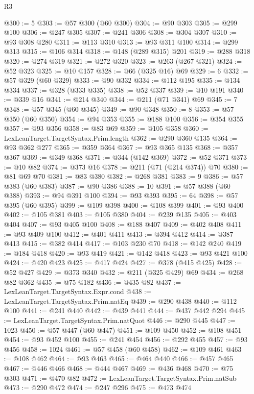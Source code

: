 \begin{lexlean}{R3}
\begin{coremodule}
@300 := 5
@303 := @57 @300 (@60 @300)
@304 := @90 @303
@305 := @299 @100
@306 := @247 @305
@307 := @241 @306
@308 := @304 @307
@310 := @93 @308 @280
@311 := @113 @310
@313 := @93 @311 @100
@314 := @299 @313
@315 := @106 @314
@318 := @148 (@289 @315) @201
@319 := @288 @318
@320 := @274 @319
@321 := @272 @320
@323 := @263 (@267 @321)
@324 := @52 @323
@325 := @10 @157
@328 := @66 (@325 @16) @69
@329 := 6
@332 := @57 @329 (@60 @329)
@333 := @90 @332
@334 := @112 @195
@335 := @134 @334
@337 := @328 (@333 @335)
@338 := @52 @337
@339 := @10 @191
@340 := @339 @16
@341 := @214 @340
@344 := @211 (@71 @341) @69
@345 := 7
@348 := @57 @345 (@60 @345)
@349 := @90 @348
@350 := 8
@353 := @57 @350 (@60 @350)
@354 := @94 @353
@355 := @188 @100
@356 := @354 @355
@357 := @93 @356
@358 := @83 @69
@359 := @105 @358
@360 := LexLeanTarget.TargetSyntax.Prim.length
@362 := @290 @360 @135
@364 := @93 @362 @277
@365 := @359 @364
@367 := @93 @365 @135
@368 := @357 @367
@369 := @349 @368
@371 := @344 (@142 @369)
@372 := @52 @371
@373 := @10 @82
@374 := @373 @16
@378 := @211 (@71 (@214 @374)) @70
@380 := @81 @69 @70
@381 := @83 @380
@382 := @268 @381
@383 := 9
@386 := @57 @383 (@60 @383)
@387 := @90 @386
@388 := 10
@391 := @57 @388 (@60 @388)
@393 := @94 @391 @100
@394 := @93 @393
@395 := 64
@398 := @57 @395 (@60 @395)
@399 := @109 @398
@400 := @108 @399
@401 := @93 @400
@402 := @105 @381
@403 := @105 @380
@404 := @239 @135
@405 := @403 @404
@407 := @93 @405 @100
@408 := @188 @407
@409 := @402 @408
@411 := @93 @409 @100
@412 := @401 @411
@413 := @394 @412
@414 := @387 @413
@415 := @382 @414
@417 := @103 @230 @70
@418 := @142 @240
@419 := @184 @418
@420 := @93 @419
@421 := @142 @418
@423 := @93 @421 @100
@424 := @420 @423
@425 := @417 @424
@427 := @378 (@415 @425)
@428 := @52 @427
@429 := @373 @340
@432 := @211 (@325 @429) @69
@434 := @268 @82 @362
@435 := @75 @182
@436 := @435 @82
@437 := LexLeanTarget.TargetSyntax.Expr.cond
@438 := LexLeanTarget.TargetSyntax.Prim.natEq
@439 := @290 @438
@440 := @112 @100
@441 := @241 @440
@442 := @439 @441
@444 := @437 @442 @294
@445 := LexLeanTarget.TargetSyntax.Prim.natQuot
@446 := @290 @445
@447 := 1023
@450 := @57 @447 (@60 @447)
@451 := @109 @450
@452 := @108 @451
@454 := @93 @452 @100
@455 := @241 @454
@456 := @292 @455
@457 := @93 @456
@458 := 1024
@461 := @57 @458 (@60 @458)
@462 := @109 @461
@463 := @108 @462
@464 := @93 @463
@465 := @464 @440
@466 := @457 @465
@467 := @446 @466
@468 := @444 @467
@469 := @436 @468
@470 := @75 @303
@471 := @470 @82
@472 := LexLeanTarget.TargetSyntax.Prim.natSub
@473 := @290 @472
@474 := @247 @296
@475 := @473 @474

\end{coremodule}
\end{lexlean}
